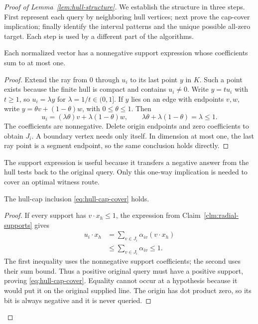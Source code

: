 \begin{proof}[Proof of Lemma~\ref{lem:hull-structure}]
We establish the structure in three steps. First represent each query
by neighboring hull vertices; next prove the cap-cover implication;
finally identify the interval patterns and the unique possible
all-zero target. Each step is used by a different part of the algorithms.

\begin{claim}
\label{clm:radial-supports}
Each normalized vector has a nonnegative support expression whose
coefficients sum to at most one.
\end{claim}
\begin{proof}
Extend the ray from $0$ through $u_i$ to its last point $y$ in $K$.
Such a point exists because the finite hull is compact and contains
$u_i\ne0$. Write $y=t u_i$ with $t\ge1$, so
$u_i=\lambda y$ for $\lambda=1/t\in(0,1]$.
If $y$ lies on an edge with endpoints $v,w$, write
$y=\theta v+(1-\theta)w$, with $0\le\theta\le1$. Then
\[
 u_i=(\lambda\theta)v+\lambda(1-\theta)w,\qquad
 \lambda\theta+\lambda(1-\theta)=\lambda\le1.
\]
The coefficients are nonnegative. Delete origin endpoints and zero coefficients
to obtain $J_i$. A boundary vertex needs only itself.
In dimension at most one, the last ray point is a segment endpoint,
so the same conclusion holds directly.
\end{proof}

The support expression is useful because it transfers a negative
answer from the hull tests back to the original query. Only this
one-way implication is needed to cover an optimal witness route.

\begin{claim}
\label{clm:negative-supports}
The hull-cap inclusion \eqref{eq:hull-cap-cover} holds.
\end{claim}
\begin{proof}
If every support has $v\cdot x_h\le1$, the expression from
Claim~\ref{clm:radial-supports} gives
\[
 \begin{aligned}
 u_i\cdot x_h
 &=\sum_{v\in J_i}\alpha_{iv}(v\cdot x_h)\\
 &\le\sum_{v\in J_i}\alpha_{iv}\le1.
 \end{aligned}
\]
The first inequality uses the nonnegative support coefficients;
the second uses their sum bound. Thus a positive original query
must have a positive support, proving
\eqref{eq:hull-cap-cover}. Equality cannot occur at a hypothesis
because it would put it on the original supplied line.
The origin has dot product zero, so its bit is always negative
and it is never queried.
\end{proof}


\end{proof}
